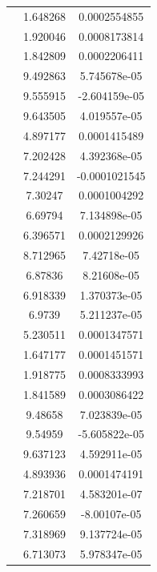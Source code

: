 \begin{table}[t]
\begin{tabular}{c c c  }
 & 1.648268 & 0.0002554855\\
 & 1.920046 & 0.0008173814\\
 & 1.842809 & 0.0002206411\\
 & 9.492863 & 5.745678e-05\\
 & 9.555915 & -2.604159e-05\\
 & 9.643505 & 4.019557e-05\\
 & 4.897177 & 0.0001415489\\
 & 7.202428 & 4.392368e-05\\
 & 7.244291 & -0.0001021545\\
 & 7.30247 & 0.0001004292\\
 & 6.69794 & 7.134898e-05\\
 & 6.396571 & 0.0002129926\\
 & 8.712965 & 7.42718e-05\\
 & 6.87836 & 8.21608e-05\\
 & 6.918339 & 1.370373e-05\\
 & 6.9739 & 5.211237e-05\\
 & 5.230511 & 0.0001347571\\
 & 1.647177 & 0.0001451571\\
 & 1.918775 & 0.0008333993\\
 & 1.841589 & 0.0003086422\\
 & 9.48658 & 7.023839e-05\\
 & 9.54959 & -5.605822e-05\\
 & 9.637123 & 4.592911e-05\\
 & 4.893936 & 0.0001474191\\
 & 7.218701 & 4.583201e-07\\
 & 7.260659 & -8.00107e-05\\
 & 7.318969 & 9.137724e-05\\
 & 6.713073 & 5.978347e-05\\
[1ex]
\hline
\end{tabular}
\label{table:nonlin}
\end{table}\par




